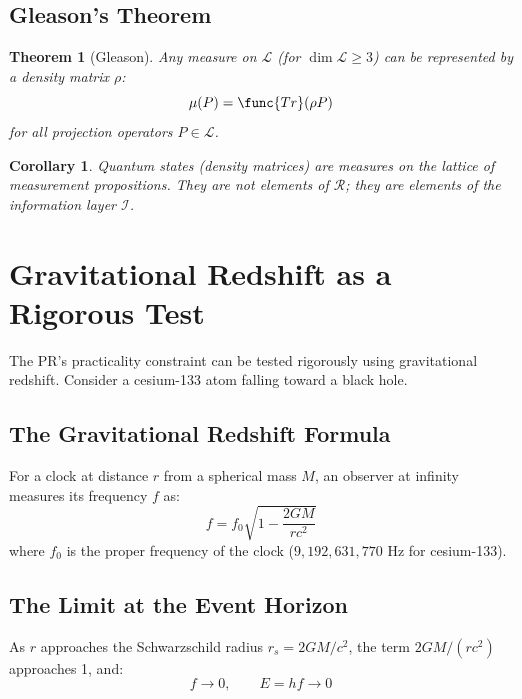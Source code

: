 \documentclass[aps,preprint,showpacs,showkeys]{revtex4}
\newtheorem{theorem}{Theorem}
\newtheorem{corollary}{Corollary}
\begin{document}
\subsection{Gleason's Theorem}

\begin{theorem}[Gleason]
Any measure on $\mathcal{L}$ (for $\dim \mathcal{L} \ge 3$) can be
represented by a density matrix $\rho$: 
\begin{equation}
\mu(P) = \func{Tr}(\rho P)
\end{equation}
for all projection operators $P \in \mathcal{L}$.
\end{theorem}

\begin{corollary}
Quantum states (density matrices) are measures on the lattice of measurement
propositions. They are not elements of $\mathcal{R}$; they are elements of
the information layer $\mathcal{I}$.
\end{corollary}

\section{Gravitational Redshift as a Rigorous Test}

The PR's practicality constraint can be tested rigorously using
gravitational redshift. Consider a cesium-133 atom falling toward a black
hole.

\subsection{The Gravitational Redshift Formula}

For a clock at distance $r$ from a spherical mass $M$, an observer at
infinity measures its frequency $f$ as: 
\begin{equation}
f = f_0 \sqrt{1 - \frac{2GM}{rc^2}}
\end{equation}
where $f_0$ is the proper frequency of the clock ($9,192,631,770$ Hz for
cesium-133).

\subsection{The Limit at the Event Horizon}

As $r$ approaches the Schwarzschild radius $r_s = 2GM/c^2$, the term $%
2GM/(rc^2)$ approaches 1, and: 
\begin{equation}
f \rightarrow 0, \qquad E = hf \rightarrow 0
\end{equation}
\end{document}
